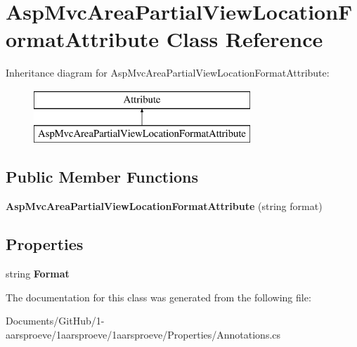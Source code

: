 \hypertarget{class_asp_mvc_area_partial_view_location_format_attribute}{}\section{Asp\+Mvc\+Area\+Partial\+View\+Location\+Format\+Attribute Class Reference}
\label{class_asp_mvc_area_partial_view_location_format_attribute}
Inheritance diagram for Asp\+Mvc\+Area\+Partial\+View\+Location\+Format\+Attribute\+:\begin{figure}[H]
\begin{center}
\leavevmode
\includegraphics[height=2.000000cm]{class_asp_mvc_area_partial_view_location_format_attribute}
\end{center}
\end{figure}
\subsection*{Public Member Functions}
\begin{DoxyCompactItemize}
\item 
\hypertarget{class_asp_mvc_area_partial_view_location_format_attribute_a2cceb11c102f6ddf218094062d74b161}{}{\bfseries Asp\+Mvc\+Area\+Partial\+View\+Location\+Format\+Attribute} (string format)\label{class_asp_mvc_area_partial_view_location_format_attribute_a2cceb11c102f6ddf218094062d74b161}

\end{DoxyCompactItemize}
\subsection*{Properties}
\begin{DoxyCompactItemize}
\item 
\hypertarget{class_asp_mvc_area_partial_view_location_format_attribute_a9de8c471614445bbbcbf2051209ec446}{}string {\bfseries Format}\label{class_asp_mvc_area_partial_view_location_format_attribute_a9de8c471614445bbbcbf2051209ec446}

\end{DoxyCompactItemize}


The documentation for this class was generated from the following file\+:\begin{DoxyCompactItemize}
\item 
Documents/\+Git\+Hub/1-\/aarsproeve/1aarsproeve/1aarsproeve/\+Properties/Annotations.\+cs\end{DoxyCompactItemize}
